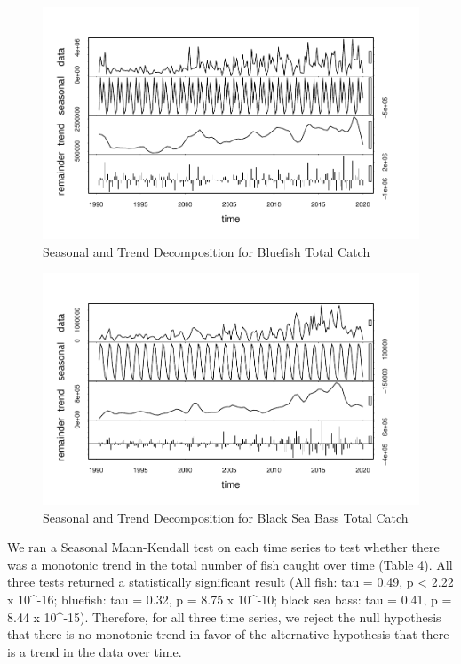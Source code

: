 \documentclass[
  12pt,
]{article}
\begin{document}
\begin{figure}[H]

\hfill{}\includegraphics{Report_FishTrends_files/figure-latex/Bluefish Trends-1} 

\caption{Seasonal and Trend Decomposition for Bluefish Total Catch}\label{fig:Bluefish Trends}
\end{figure}

\begin{figure}[H]

\hfill{}\includegraphics{Report_FishTrends_files/figure-latex/Black Sea Bass Trends-1} 

\caption{Seasonal and Trend Decomposition for Black Sea Bass Total Catch}\label{fig:Black Sea Bass Trends}
\end{figure}

We ran a Seasonal Mann-Kendall test on each time series to test whether
there was a monotonic trend in the total number of fish caught over time
(Table 4). All three tests returned a statistically significant result
(All fish: tau = 0.49, p \textless{} 2.22 x 10\^{}-16; bluefish: tau =
0.32, p = 8.75 x 10\^{}-10; black sea bass: tau = 0.41, p = 8.44 x
10\^{}-15). Therefore, for all three time series, we reject the null
hypothesis that there is no monotonic trend in favor of the alternative
hypothesis that there is a trend in the data over time.
\end{document}
